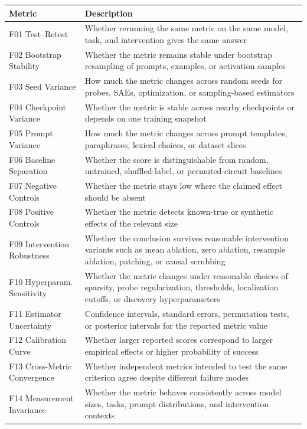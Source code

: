 \documentclass{article}
\begin{document}
\begin{minipage}{\linewidth}
\par
\begin{center}
\begin{tabular}{@{}lp{10cm}@{}}
\toprule
\textbf{Metric} & \textbf{Description} \\
\midrule
F01 Test--Retest & Whether rerunning the same metric on the same model, task, and intervention gives the same answer \\
\midrule
F02 Bootstrap Stability & Whether the metric remains stable under bootstrap resampling of prompts, examples, or activation samples \\
\midrule
F03 Seed Variance & How much the metric changes across random seeds for probes, SAEs, optimization, or sampling-based estimators \\
\midrule
F04 Checkpoint Variance & Whether the metric is stable across nearby checkpoints or depends on one training snapshot \\
\midrule
F05 Prompt Variance & How much the metric changes across prompt templates, paraphrases, lexical choices, or dataset slices \\
\midrule
F06 Baseline Separation & Whether the score is distinguishable from random, untrained, shuffled-label, or permuted-circuit baselines \\
\midrule
F07 Negative Controls & Whether the metric stays low where the claimed effect should be absent \\
\midrule
F08 Positive Controls & Whether the metric detects known-true or synthetic effects of the relevant size \\
\midrule
F09 Intervention Robustness & Whether the conclusion survives reasonable intervention variants such as mean ablation, zero ablation, resample ablation, patching, or causal scrubbing \\
\midrule
F10 Hyperparam. Sensitivity & Whether the metric changes under reasonable choices of sparsity, probe regularization, thresholds, localization cutoffs, or discovery hyperparameters \\
\midrule
F11 Estimator Uncertainty & Confidence intervals, standard errors, permutation tests, or posterior intervals for the reported metric value \\
\midrule
F12 Calibration Curve & Whether larger reported scores correspond to larger empirical effects or higher probability of success \\
\midrule
F13 Cross-Metric Convergence & Whether independent metrics intended to test the same criterion agree despite different failure modes \\
\midrule
F14 Measurement Invariance & Whether the metric behaves consistently across model sizes, tasks, prompt distributions, and intervention contexts \\
\bottomrule
\end{tabular}
\end{center}
\end{minipage}

\endgroup
\end{document}

